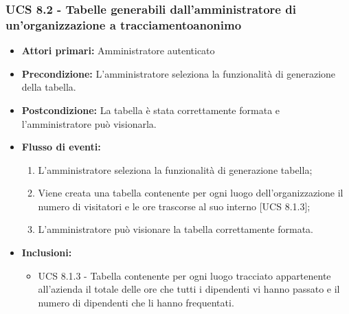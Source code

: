 \subsubsection{UCS 8.2 - Tabelle generabili dall'amministratore di un'organizzazione a tracciamentoanonimo}%
\begin{itemize}
\item \textbf{Attori primari:} Amministratore autenticato
\item \textbf{Precondizione:} L'amministratore seleziona la funzionalità di generazione della tabella.
\item \textbf{Postcondizione:} La tabella è stata correttamente formata e l'amministratore può visionarla.
\item \textbf{Flusso di eventi:}
	\begin{enumerate}%
	\item L'amministratore seleziona la funzionalità di generazione tabella;
	\item Viene creata una tabella contenente per ogni luogo dell'organizzazione il numero di visitatori e le ore trascorse al suo interno [UCS 8.1.3];
	\item L'amministratore può visionare la tabella correttamente formata.
\end{enumerate}
\item \textbf{Inclusioni:} 
\begin{itemize}
		\item UCS 8.1.3 - Tabella contenente per ogni luogo tracciato appartenente all'azienda il totale delle ore che tutti i dipendenti vi hanno passato e il numero di dipendenti che li hanno frequentati.
	\end{itemize}
\end{itemize}
